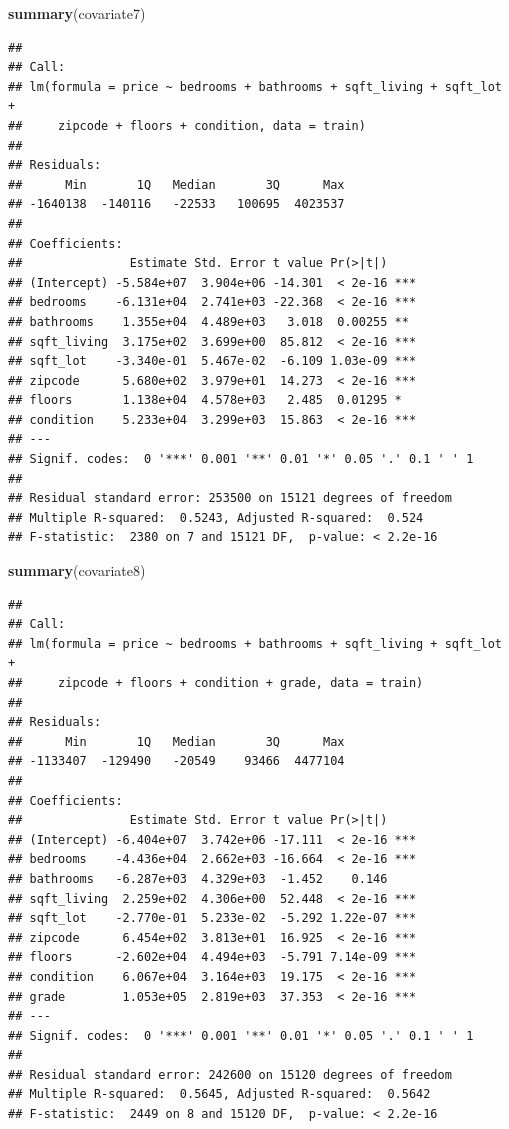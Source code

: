 \documentclass[
]{article}
\newenvironment{Shaded}{\begin{snugshade}}{\end{snugshade}}
\newcommand{\KeywordTok}[1]{\textcolor[rgb]{0.13,0.29,0.53}{\textbf{#1}}}
\newcommand{\NormalTok}[1]{#1}
\begin{document}
\begin{Shaded}
\begin{Highlighting}[]
\KeywordTok{summary}\NormalTok{(covariate7)}
\end{Highlighting}
\end{Shaded}

\begin{verbatim}
## 
## Call:
## lm(formula = price ~ bedrooms + bathrooms + sqft_living + sqft_lot + 
##     zipcode + floors + condition, data = train)
## 
## Residuals:
##      Min       1Q   Median       3Q      Max 
## -1640138  -140116   -22533   100695  4023537 
## 
## Coefficients:
##               Estimate Std. Error t value Pr(>|t|)    
## (Intercept) -5.584e+07  3.904e+06 -14.301  < 2e-16 ***
## bedrooms    -6.131e+04  2.741e+03 -22.368  < 2e-16 ***
## bathrooms    1.355e+04  4.489e+03   3.018  0.00255 ** 
## sqft_living  3.175e+02  3.699e+00  85.812  < 2e-16 ***
## sqft_lot    -3.340e-01  5.467e-02  -6.109 1.03e-09 ***
## zipcode      5.680e+02  3.979e+01  14.273  < 2e-16 ***
## floors       1.138e+04  4.578e+03   2.485  0.01295 *  
## condition    5.233e+04  3.299e+03  15.863  < 2e-16 ***
## ---
## Signif. codes:  0 '***' 0.001 '**' 0.01 '*' 0.05 '.' 0.1 ' ' 1
## 
## Residual standard error: 253500 on 15121 degrees of freedom
## Multiple R-squared:  0.5243, Adjusted R-squared:  0.524 
## F-statistic:  2380 on 7 and 15121 DF,  p-value: < 2.2e-16
\end{verbatim}

\begin{Shaded}
\begin{Highlighting}[]
\KeywordTok{summary}\NormalTok{(covariate8)}
\end{Highlighting}
\end{Shaded}

\begin{verbatim}
## 
## Call:
## lm(formula = price ~ bedrooms + bathrooms + sqft_living + sqft_lot + 
##     zipcode + floors + condition + grade, data = train)
## 
## Residuals:
##      Min       1Q   Median       3Q      Max 
## -1133407  -129490   -20549    93466  4477104 
## 
## Coefficients:
##               Estimate Std. Error t value Pr(>|t|)    
## (Intercept) -6.404e+07  3.742e+06 -17.111  < 2e-16 ***
## bedrooms    -4.436e+04  2.662e+03 -16.664  < 2e-16 ***
## bathrooms   -6.287e+03  4.329e+03  -1.452    0.146    
## sqft_living  2.259e+02  4.306e+00  52.448  < 2e-16 ***
## sqft_lot    -2.770e-01  5.233e-02  -5.292 1.22e-07 ***
## zipcode      6.454e+02  3.813e+01  16.925  < 2e-16 ***
## floors      -2.602e+04  4.494e+03  -5.791 7.14e-09 ***
## condition    6.067e+04  3.164e+03  19.175  < 2e-16 ***
## grade        1.053e+05  2.819e+03  37.353  < 2e-16 ***
## ---
## Signif. codes:  0 '***' 0.001 '**' 0.01 '*' 0.05 '.' 0.1 ' ' 1
## 
## Residual standard error: 242600 on 15120 degrees of freedom
## Multiple R-squared:  0.5645, Adjusted R-squared:  0.5642 
## F-statistic:  2449 on 8 and 15120 DF,  p-value: < 2.2e-16
\end{verbatim}
\end{document}
